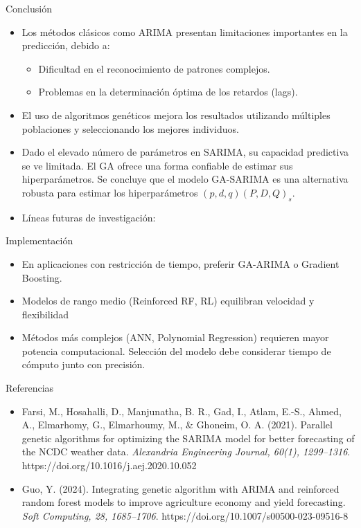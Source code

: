 \documentclass[aspectratio=1610]{beamer}
\begin{document}
\begin{frame}{Conclusión}
\begin{itemize}
    \item Los métodos clásicos como ARIMA presentan limitaciones importantes en la predicción, debido a:
    \begin{itemize}
        \item Dificultad en el reconocimiento de patrones complejos.
        \item Problemas en la determinación óptima de los retardos (lags).
    \end{itemize}
    \item El uso de algoritmos genéticos mejora los resultados utilizando múltiples poblaciones y seleccionando los mejores individuos.
    \item Dado el elevado número de parámetros en SARIMA, su capacidad predictiva se ve limitada. El GA ofrece una forma confiable de estimar sus hiperparámetros. Se concluye que el modelo GA-SARIMA es una alternativa robusta para estimar los hiperparámetros \((p,d,q)(P,D,Q)_s\).
    \item Líneas futuras de investigación:
\end{itemize}
\end{frame}

\begin{frame}{Implementación}
  \begin{itemize}
      \item En aplicaciones con restricción de tiempo, preferir GA-ARIMA o Gradient Boosting.  
      \item Modelos de rango medio (Reinforced RF, RL) equilibran velocidad y
flexibilidad
      \item Métodos más complejos (ANN, Polynomial Regression) requieren mayor
potencia computacional.
Selección del modelo debe considerar tiempo de cómputo junto con
precisión.
  \end{itemize}
\end{frame}






\begin{frame}{Referencias}
\begin{itemize}
    \item Farsi, M., Hosahalli, D., Manjunatha, B. R., Gad, I., Atlam, E.-S., Ahmed, A., Elmarhomy, G., Elmarhoumy, M., & Ghoneim, O. A. (2021). Parallel genetic algorithms for optimizing the SARIMA model for better forecasting of the NCDC weather data. \textit{Alexandria Engineering Journal, 60(1), 1299–1316}. https://doi.org/10.1016/j.aej.2020.10.052
    \item  Guo, Y. (2024). Integrating genetic algorithm with ARIMA and reinforced random forest models to improve agriculture economy and yield forecasting. \textit{Soft Computing, 28, 1685–1706}. https://doi.org/10.1007/s00500-023-09516-8 
\end{itemize}
\end{frame}









\end{document}
